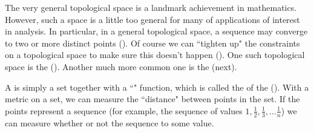 \begin{liste}
  \item The very general topological space is a landmark achievement in mathematics. \label{item:top_converge}
        However, such a space is a little too general for many of applications of interest in analysis. 
        In particular, in a general topological space, a sequence may converge to two or more distinct points ().
        Of course we can ``tighten up" the constraints on a topological space to make sure this doesn't happen ().
        One such topological space is the  (). 
        Another much more common one is the  (next).

  \item A  is simply a set together with a ``" function,
        which is called the  of the  ().
        With a metric on a set, we can measure the ``distance" between points in the set.
        If the points represent a sequence
        (for example, the sequence of values $1,\frac{1}{2},\frac{1}{3},\ldots\frac{1}{n}$)
        we can measure whether or not the sequence  to some value.


\end{liste}
